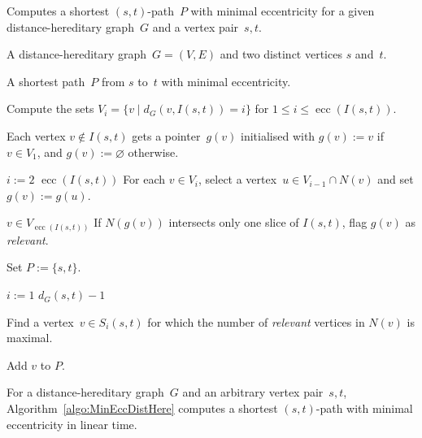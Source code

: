 \documentclass[10pt]{llncs}
\DeclareMathOperator{\ecc}{ecc}
\begin{document}
\begin{algorithm}
    [htb]
    \caption
    {
        \label{algo:MinEccDistHere}
        Computes a shortest $(s,t)$-path~$P$ with minimal eccentricity for a given distance-hereditary graph~$G$ and a vertex pair~$s,t$.
    }

\KwIn
{
    A distance-hereditary graph~$G = (V, E)$ and two distinct vertices $s$ and~$t$.
}

\KwOut
{
    A shortest path~$P$ from $s$ to~$t$ with minimal eccentricity.
}

Compute the sets $V_i = \{ v \mid d_G(v, I(s,t)) = i \}$ for $1 \leq i \leq \ecc(I(s,t))$.

Each vertex $v \notin I(s,t)$ gets a pointer~$g(v)$ initialised with $g(v) := v$ if $v \in V_1$, and $g(v) := \varnothing$ otherwise.

\For
{
    $i := 2$ \KwTo $\ecc(I(s,t))$
    \label{line:dhgFindGateLoop}
}
{
    For each $v \in V_i$, select a vertex~$u \in V_{i-1} \cap N(v)$ and set $g(v) := g(u)$.
    \label{line:dhgFindGateIteration}
}

\ForEach
{
    $v \in V_{\ecc(I(s,t))}$
}
{
    If $N(g(v))$ intersects only one slice of $I(s,t)$, flag $g(v)$ as \emph{relevant}. 
    \label{line:dhgFlagRelevant}
}

Set $P := \{ s, t \}$.

\For
{
    $i := 1$ \KwTo $d_G(s,t) - 1$
    \label{line:dhgSelectPLoop}
}
{
    Find a vertex~$v \in S_i(s,t)$ for which the number of \emph{relevant} vertices in $N(v)$ is maximal.

    Add $v$ to $P$.
    \label{line:dhgSelectPAddV}
}

\end{algorithm}


\begin{lemma}
    \label{lm:path-pair} 
For a distance-hereditary graph~$G$ and an arbitrary vertex pair~$s,t$, Algorithm~\ref{algo:MinEccDistHere} computes a shortest $(s,t)$-path with minimal eccentricity in linear time.
\end{lemma}
\end{document}
